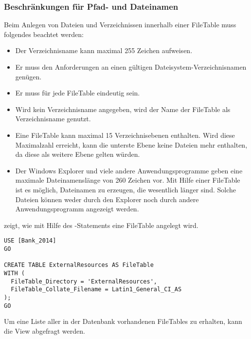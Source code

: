         \subsubsection{Beschränkungen für Pfad- und Dateinamen}             
          Beim Anlegen von Dateien und Verzeichnissen innerhalb einer FileTable
          muss folgendes beachtet werden:
          \begin{itemize}
              \item Der Verzeichnisname kann maximal 255 Zeichen aufweisen. 
              \item Er muss den Anforderungen an einen gültigen
              Dateisystem-Verzeichnisnamen genügen.
              \item Er muss für jede FileTable eindeutig sein.
              \item Wird kein Verzeichnisname angegeben, wird der Name der
              FileTable als Verzeichnisname genutzt.
              \item Eine FileTable kann maximal 15 Verzeichnisebenen enthalten.
              Wird diese Maximalzahl erreicht, kann die unterste Ebene keine
              Dateien mehr enthalten, da diese als weitere Ebene gelten würden.
              \item Der Windows Explorer und viele andere Anwendungsprogramme
              geben eine maximale Dateinamenslänge von 260 Zeichen vor. Mit
              Hilfe einer FileTable ist es möglich, Dateinamen zu erzeugen, die
              wesentlich länger sind. Solche Dateien können weder durch den
              Explorer noch durch andere Anwendungsprogramm angezeigt werden.
          \end{itemize}
          \begin{literaturinternet}
            \item \cite{gg492087}
          \end{literaturinternet}
           zeigt, wie mit Hilfe des -Statements eine FileTable angelegt wird.
          \begin{lstlisting}[language=ms_sql, caption={Anlegen einer Filetable},
          label=admin04_04]
USE [Bank_2014]
GO

CREATE TABLE ExternalResources AS FileTable 
WITH (
  FileTable_Directory = 'ExternalResources',
  FileTable_Collate_Filename = Latin1_General_CI_AS
);
GO

          \end{lstlisting}
          Um eine Liste aller in der Datenbank vorhandenen FileTables zu
          erhalten, kann die View  abgefragt werden.
          \begin{literaturinternet}
            \item \cite{gg509088}
          \end{literaturinternet}
